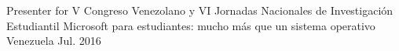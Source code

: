 \begin{cventries}
  \cventry
    {Presenter for V Congreso Venezolano y VI Jornadas Nacionales de Investigación Estudiantil}
    {Microsoft para estudiantes: mucho más que un sistema operativo}
    {Venezuela}
    {Jul. 2016}
    {
    }
\end{cventries}
